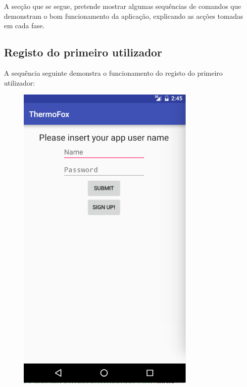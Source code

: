 \documentclass[a4paper]{article}
\begin{document}
A secção que se segue, pretende mostrar algumas sequências de comandos que demonstram o bom funcionamento da aplicação, explicando as acções tomadas em cada fase.

\subsection{Registo do primeiro utilizador}

A sequência seguinte demonstra o funcionamento do registo do primeiro utilizador:


\begin{figure}[H]
  \includegraphics[width=\linewidth]{welcomee.png}

\end{figure}
\end{document}
